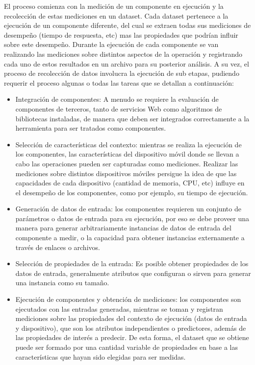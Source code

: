 \noindent El proceso comienza con la medición de un componente en
ejecución y la recolección de estas mediciones en un dataset. Cada
dataset pertenece a la ejecución de un componente diferente, del cual
se extraen todas sus mediciones de desempeño (tiempo de respuesta,
etc) mas las propiedades que podrían influir sobre este desempeño.
Durante la ejecución de cada componente se van realizando las mediciones
sobre distintos aspectos de la operación y registrando cada uno de
estos resultados en un archivo para su posterior análisis. A su vez,
el proceso de recolección de datos involucra la ejecución de sub etapas,
pudiendo requerir el proceso algunas o todas las tareas que se detallan
a continuación:
\begin{itemize}
\item Integración de componentes: A menudo se requiere la evaluación de
componentes de terceros, tanto de servicios Web como algoritmos de
bibliotecas instaladas, de manera que deben ser integrados correctamente
a la herramienta para ser tratados como componentes. 
\item Selección de características del contexto: mientras se realiza la
ejecución de los componentes, las características del dispositivo
móvil donde se llevan a cabo las operaciones pueden ser capturadas
como mediciones. Realizar las mediciones sobre distintos dispositivos
móviles persigue la idea de que las capacidades de cada dispositivo
(cantidad de memoria, CPU, etc) influye en el desempeño de los componentes,
como por ejemplo, su tiempo de ejecución.
\item Generación de datos de entrada: los componentes requieren un conjunto
de parámetros o datos de entrada para su ejecución, por eso se debe
proveer una manera para generar arbitrariamente instancias de datos
de entrada del componente a medir, o la capacidad para obtener instancias
externamente a través de enlaces o archivos. 
\item Selección de propiedades de la entrada: Es posible obtener propiedades
de los datos de entrada, generalmente atributos que configuran o sirven
para generar una instancia como su tamaño. 
\item Ejecución de componentes y obtención de mediciones: los componentes
son ejecutados con las entradas generadas, mientras se toman y registran
mediciones sobre las propiedades del contexto de ejecución (datos
de entrada y dispositivo), que son los atributos independientes o
predictores, además de las propiedades de interés a predecir. De esta
forma, el dataset que se obtiene puede ser formado por una cantidad
variable de propiedades en base a las características que hayan sido
elegidas para ser medidas. 
\end{itemize}


